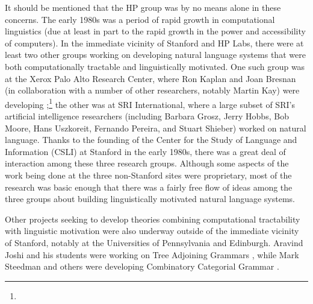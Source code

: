 \documentclass[output=paper
 	        ,biblatex
                ,babelshorthands
                ,newtxmath
                ,draftmode
                ,colorlinks, citecolor=brown
]{langscibook}
\begin{document}
It should be mentioned that the HP group was by no means alone in these concerns.  The early 1980s was a period of rapid growth in computational linguistics (due at least in part to the rapid growth in the power and accessibility of computers).  In the immediate vicinity of Stanford and HP Labs, there were at least two other groups working on developing natural language systems that were both computationally tractable and linguistically motivated.  One such group was at the Xerox Palo Alto Research Center, where Ron Kaplan and Joan Bresnan (in collaboration with a number of other researchers, notably Martin Kay) were developing ;\footnote{}  the other was at SRI International, where a large subset of SRI's artificial intelligence researchers  (including Barbara Grosz, Jerry Hobbs, Bob Moore, Hans Uszkoreit, Fernando Pereira, and Stuart Shieber) worked on natural language.  Thanks to the founding of the Center for the Study of Language and Information (CSLI) at Stanford in the early 1980s, there was a great deal of interaction among these three research groups.  Although some aspects of the work being done at the three non-Stanford sites were proprietary, most of the research was basic enough that there was a fairly free flow of ideas among the three groups about building linguistically motivated natural language systems.

Other projects seeking to develop theories combining computational tractability with linguistic motivation were also underway outside of the immediate vicinity of Stanford, notably at the Universities of Pennsylvania and Edinburgh.  Aravind Joshi and his students were working on Tree Adjoining Grammars \citep*{JLT75a-u,Joshi87a-u}, while Mark Steedman and others were developing Combinatory Categorial Grammar \citep{Steedman87a-u,Steedman90a-u}.
\end{document}
